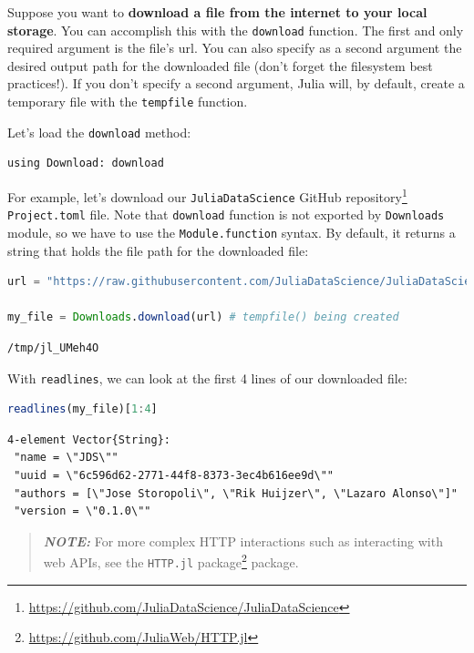 \documentclass[
  notoc %
]{tufte-book}
\DeclareRobustCommand{\href}[2]{#2\footnote{\url{#1}}}
\newcommand{\passthrough}[1]{#1}
\begin{document}
Suppose you want to \textbf{download a file from the internet to your
local storage}. You can accomplish this with the
\passthrough{\lstinline!download!} function. The first and only required
argument is the file's url. You can also specify as a second argument
the desired output path for the downloaded file (don't forget the
filesystem best practices!). If you don't specify a second argument,
Julia will, by default, create a temporary file with the
\passthrough{\lstinline!tempfile!} function.

Let's load the \passthrough{\lstinline!download!} method:

\begin{lstlisting}
using Download: download
\end{lstlisting}

For example, let's download our
\href{https://github.com/JuliaDataScience/JuliaDataScience}{\passthrough{\lstinline!JuliaDataScience!}
GitHub repository} \passthrough{\lstinline!Project.toml!} file. Note
that \passthrough{\lstinline!download!} function is not exported by
\passthrough{\lstinline!Downloads!} module, so we have to use the
\passthrough{\lstinline!Module.function!} syntax. By default, it returns
a string that holds the file path for the downloaded file:

\begin{lstlisting}[language=Julia]
url = "https://raw.githubusercontent.com/JuliaDataScience/JuliaDataScience/main/Project.toml"

my_file = Downloads.download(url) # tempfile() being created
\end{lstlisting}

\begin{lstlisting}[language=Output]
/tmp/jl_UMeh4O
\end{lstlisting}

With \passthrough{\lstinline!readlines!}, we can look at the first 4
lines of our downloaded file:

\begin{lstlisting}[language=Julia]
readlines(my_file)[1:4]
\end{lstlisting}

\begin{lstlisting}[language=Output]
4-element Vector{String}:
 "name = \"JDS\""
 "uuid = \"6c596d62-2771-44f8-8373-3ec4b616ee9d\""
 "authors = [\"Jose Storopoli\", \"Rik Huijzer\", \"Lazaro Alonso\"]"
 "version = \"0.1.0\""
\end{lstlisting}

\begin{quote}
\textbf{\emph{NOTE:}} For more complex HTTP interactions such as
interacting with web APIs, see the
\href{https://github.com/JuliaWeb/HTTP.jl}{\passthrough{\lstinline!HTTP.jl!}
package} package.
\end{quote}
\end{document}
